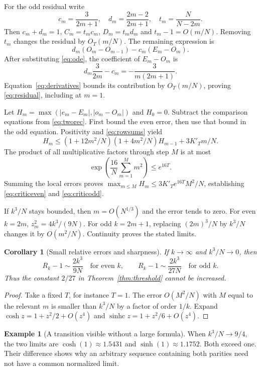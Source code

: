 \documentclass[11pt]{article}
\newtheorem{corollary}[theorem]{Corollary}
\theoremstyle{definition}
\newtheorem{example}[theorem]{Example}
\theoremstyle{remark}
\newcommand{\1}{\mathbf 1}
\newcommand{\shc}{\operatorname{sinhc}}
\begin{document}
For the odd residual write
\[
c_m=\frac3{2m+1},\quad d_m=\frac{2m-2}{2m+1},\quad t_m=\frac N{N-2m}.
\]
Then $c_m+d_m=1$, $C_m=t_mc_m$, $D_m=t_md_m$ and $t_m-1=O(m/N)$. Removing $t_m$ changes the residual by $O_T(m/N)$. The remaining expression is
\[
d_m(O_m-O_{m-1})-c_m(E_m-O_m).
\]
After substituting \eqref{eq:ode}, the coefficient of $E_m-O_m$ is
\[
d_m\frac3{2m}-c_m=-\frac3{m(2m+1)}.
\]
Equation~\eqref{eq:derivatives} bounds its contribution by $O_T(m/N)$, proving \eqref{eq:residual}, including at $m=1$.

Let $H_m=\max(|e_m-E_m|,|o_m-O_m|)$ and $H_0=0$. Subtract the comparison equations from \eqref{eq:tworec}. First bound the even error, then use that bound in the odd equation. Positivity and \eqref{eq:rowsums} yield
\[
H_m\le(1+12m^2/N)(1+4m^2/N)H_{m-1}+3K'_Tm/N.
\]
The product of all multiplicative factors through step $M$ is at most
\[
\exp\left(\frac{16}N\sum_{m=1}^M m^2\right)\le e^{16T}.
\]
Summing the local errors proves $\max_{m\le M}H_m\le3K'_Te^{16T}M^2/N$, establishing \eqref{eq:criticeven} and \eqref{eq:criticodd}.

If $k^3/N$ stays bounded, then $m=O(N^{1/3})$ and the error tends to zero. For even $k=2m$, $z_m^2=4k^3/(9N)$. For odd $k=2m+1$, replacing $(2m)^3/N$ by $k^3/N$ changes it by $O(m^2/N)$. Continuity proves the stated limits.

\begin{corollary}[Small relative errors and sharpness]\label{cor:small}
If $k\to\infty$ and $k^3/N\to0$, then
\[
R_k-1\sim\frac{2k^3}{9N}\quad\text{for even }k,
\qquad
R_k-1\sim\frac{2k^3}{27N}\quad\text{for odd }k.
\]
Thus the constant $2/27$ in Theorem~\ref{thm:threshold} cannot be increased.
\end{corollary}
\begin{proof}
Take a fixed $T$, for instance $T=1$. The error $O(M^2/N)$ with $M$ equal to the relevant $m$ is smaller than $k^3/N$ by a factor of order $1/k$. Expand $\cosh z=1+z^2/2+O(z^4)$ and $\shc z=1+z^2/6+O(z^4)$.
\end{proof}

\begin{example}[A transition visible without a large formula]
When $k^3/N\to9/4$, the two limits are $\cosh(1)\approx1.5431$ and $\sinh(1)\approx1.1752$. Both exceed one. Their difference shows why an arbitrary sequence containing both parities need not have a common normalized limit.
\end{example}

\end{document}
